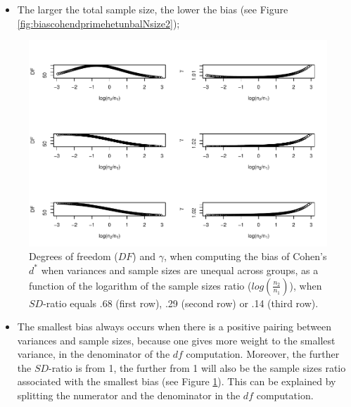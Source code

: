 \documentclass[
  english,
  man,mask]{apa6}
\providecommand{\tightlist}{%
  \setlength{\itemsep}{0pt}\setlength{\parskip}{0pt}}
\begin{document}
\begin{itemize}
\tightlist
\item
  The larger the total sample size, the lower the bias (see Figure \ref{fig:biascohendprimehetunbalNsize2});
\end{itemize}

\begin{figure}
\centering
\includegraphics{Theoretical-Bias-of-all-estimators-as-a-function-of-population-parameters_files/figure-latex/biascohendprimehetunbalnratiosdratio2-1.pdf}
\caption{\label{fig:biascohendprimehetunbalnratiosdratio2}Degrees of freedom (\(DF\)) and \(\gamma\), when computing the bias of Cohen's \(d^*\) when variances and sample sizes are unequal across groups, as a function of the logarithm of the sample sizes ratio (\(log \left( \frac{n_2}{n_1} \right)\)), when \(SD\)-ratio equals .68 (first row), .29 (second row) or .14 (third row).}
\end{figure}

\begin{itemize}
\tightlist
\item
  The smallest bias always occurs when there is a positive pairing between variances and sample sizes, because one gives more weight to the smallest variance, in the denominator of the \(df\) computation. Moreover, the further the \(SD\)-ratio is from 1, the further from 1 will also be the sample sizes ratio associated with the smallest bias (see Figure \ref{fig:biascohendprimehetunbalnratiosdratio2}). This can be explained by splitting the numerator and the denominator in the \(df\) computation.
\end{itemize}
\end{document}

